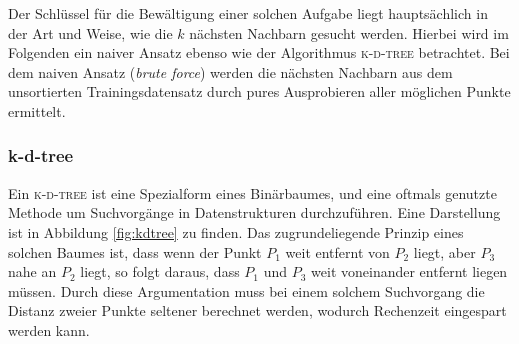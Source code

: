 Der Schlüssel für die Bewältigung einer solchen Aufgabe liegt hauptsächlich in der Art und Weise, wie die $k$ nächsten Nachbarn gesucht werden. Hierbei wird im Folgenden ein naiver Ansatz ebenso wie der Algorithmus \textsc{k-d-tree} betrachtet. Bei dem naiven Ansatz (\textit{brute force}) werden die nächsten Nachbarn aus dem unsortierten Trainingsdatensatz durch pures Ausprobieren aller möglichen Punkte ermittelt.

\subsubsection{k-d-tree}
Ein \textsc{k-d-tree} ist eine Spezialform eines Binärbaumes, und eine oftmals genutzte Methode um Suchvorgänge in Datenstrukturen durchzuführen. Eine Darstellung ist in Abbildung \ref{fig:kdtree} zu finden. Das zugrundeliegende Prinzip eines solchen Baumes ist, dass wenn der Punkt $P_1$ weit entfernt von $P_2$ liegt, aber $P_3$ nahe an $P_2$ liegt, so folgt daraus, dass $P_1$ und $P_3$ weit voneinander entfernt liegen müssen. Durch diese Argumentation muss bei einem solchem Suchvorgang die Distanz zweier Punkte seltener berechnet werden, wodurch Rechenzeit eingespart werden kann.\\

